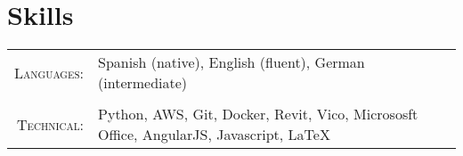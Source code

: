 \documentclass[a4paper,10pt]{article}
\begin{document}

\section{Skills}
\begin{tabularx}{\textwidth}{rX}
 \textsc{Languages:}& Spanish (native), English (fluent), German (intermediate)\\ \\ 
\textsc{Technical:}& Python, AWS,  Git, Docker, Revit, Vico, Micrososft Office, AngularJS, Javascript, \LaTeX\\
\end{tabularx}
\end{document}
